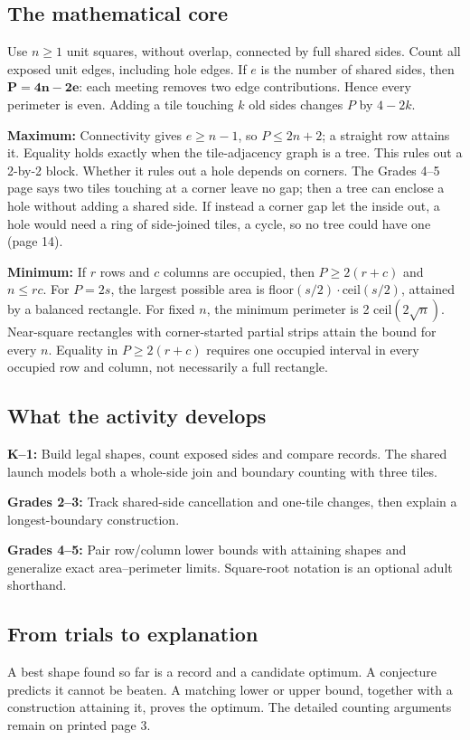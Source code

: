 \subsection*{The mathematical core}
Use $n \ge 1$ unit squares, without overlap, connected by full shared sides. Count all exposed unit edges, including hole edges. If $e$ is the number of shared sides, then $\mathbf{P=4n-2e}$: each meeting removes two edge contributions. Hence every perimeter is even. Adding a tile touching $k$ old sides changes $P$ by $4-2k$.

\textbf{Maximum:} Connectivity gives $e \ge n-1$, so $P \le 2n+2$; a straight row attains it. Equality holds exactly when the tile-adjacency graph is a tree. This rules out a 2-by-2 block. Whether it rules out a hole depends on corners. The Grades 4--5 page says two tiles touching at a corner leave no gap; then a tree can enclose a hole without adding a shared side. If instead a corner gap let the inside out, a hole would need a ring of side-joined tiles, a cycle, so no tree could have one (page 14).

\textbf{Minimum:} If $r$ rows and $c$ columns are occupied, then $P \ge 2(r+c)$ and $n \le rc$. For $P=2s$, the largest possible area is floor$(s/2)\cdot$ceil$(s/2)$, attained by a balanced rectangle. For fixed $n$, the minimum perimeter is 2 ceil$(2\sqrt{n})$. Near-square rectangles with corner-started partial strips attain the bound for every $n$. Equality in $P \ge 2(r+c)$ requires one occupied interval in every occupied row and column, not necessarily a full rectangle.

\subsection*{What the activity develops}
\textbf{K--1:} Build legal shapes, count exposed sides and compare records. The shared launch models both a whole-side join and boundary counting with three tiles.

\textbf{Grades 2--3:} Track shared-side cancellation and one-tile changes, then explain a longest-boundary construction.

\textbf{Grades 4--5:} Pair row/column lower bounds with attaining shapes and generalize exact area--perimeter limits. Square-root notation is an optional adult shorthand.

\subsection*{From trials to explanation}
A best shape found so far is a record and a candidate optimum. A conjecture predicts it cannot be beaten. A matching lower or upper bound, together with a construction attaining it, proves the optimum. The detailed counting arguments remain on printed page 3.
